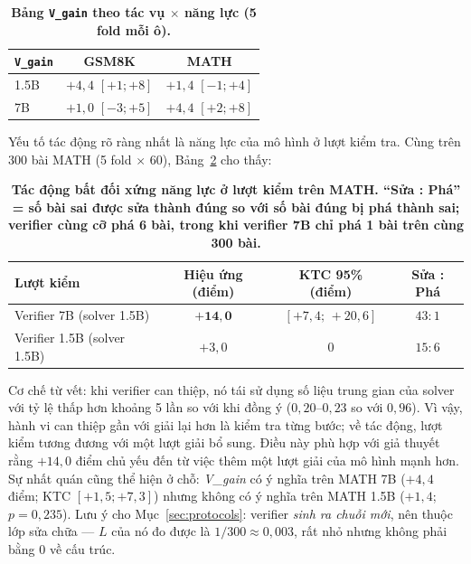 \documentclass[12pt,a4paper]{article}
\begin{document}
\begin{table}[h]\centering\small
\begin{tabular}{@{}l c c@{}}
\toprule
\texttt{V\_gain}  & GSM8K & MATH\\
\midrule
1.5B & \(+4{,}4\) \([+1;+8]\) & \(+1{,}4\) \([-1;+4]\)\\
7B   & \(+1{,}0\) \([-3;+5]\) & \(+4{,}4\) \([+2;+8]\)\\
\bottomrule
\end{tabular}
\caption{\textbf{Bảng \texttt{V\_gain} theo tác vụ \(\times\) năng lực (5 fold mỗi ô).}}
\label{tab:vgaingrid}
\end{table}

Yếu tố tác động rõ ràng nhất là năng lực của mô hình ở lượt kiểm tra. Cùng trên 300 bài MATH (5 fold \(\times\) 60), Bảng~\ref{tab:verifier} cho thấy:

\begin{table}[h]\centering\small
\begin{tabular}{@{}l c c c@{}}
\toprule
Lượt kiểm & Hiệu ứng (điểm) & KTC 95\% (điểm) & Sửa : Phá\\
\midrule
Verifier 7B (solver 1.5B) & \(\mathbf{+14{,}0}\) & \([+7{,}4;\,+20{,}6]\) & \(43:1\)\\
Verifier 1.5B (solver 1.5B) & \(+3{,}0\) & 0 & \(15:6\)\\
\bottomrule
\end{tabular}
\caption{\textbf{Tác động bất đối xứng năng lực ở lượt kiểm trên MATH. ``Sửa : Phá'' = số bài sai được sửa thành đúng so với số bài đúng bị phá thành sai; verifier cùng cỡ phá 6 bài, trong khi verifier 7B chỉ phá 1 bài trên cùng 300 bài.}}
\label{tab:verifier}
\end{table}

Cơ chế từ vết: khi verifier can thiệp, nó tái sử dụng số liệu trung gian của solver với tỷ lệ thấp hơn khoảng 5 lần so với khi đồng ý (\(0{,}20\)--\(0{,}23\) so với \(0{,}96\)). Vì vậy, hành vi can thiệp gần với giải lại hơn là kiểm tra từng bước; về tác động, lượt kiểm tương đương với một lượt giải bổ sung. Điều này phù hợp với giả thuyết rằng \(+14{,}0\) điểm chủ yếu đến từ việc thêm một lượt giải của mô hình mạnh hơn. Sự nhất quán cũng thể hiện ở chỗ: \textit{V\_gain} có ý nghĩa trên MATH 7B (\(+4{,}4\) điểm; KTC \([+1{,}5;+7{,}3]\)) nhưng không có ý nghĩa trên MATH 1.5B (\(+1{,}4\); \(p=0{,}235\)). Lưu ý cho Mục~\ref{sec:protocols}: verifier \textit{sinh ra chuỗi mới}, nên thuộc lớp sửa chữa --- \(L\) của nó đo được là \(1/300 \approx 0{,}003\), rất nhỏ nhưng không phải bằng 0 về cấu trúc.
\end{document}
